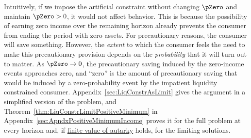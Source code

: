 \documentclass[\econtexRoot/BufferStockTheory]{subfiles}
\begin{document}
Intuitively, if we impose the artificial constraint without changing $\pZero$ and maintain $\pZero>0$, it would not affect behavior.
This is because the possibility of earning zero income over the remaining horizon already prevents the consumer from ending the period with zero assets.
For precautionary reasons, the consumer will save something.
However, the \textit{extent} to which the consumer feels the need to make this precautionary provision depends on the \textit{probability} that it will turn out to matter.
As  $\pZero \rightarrow 0$, the   precautionary saving induced by the zero-income events approaches zero, and ``zero'' is the amount of precautionary saving that would be induced by a zero-probability event by the impatient liquidity constrained consumer.
Appendix~\ref{sec:LiqConstrAsLimit} gives the argument in a simplified version of the problem, and Theorem~\ref{thm:LiqConstrLimitPositiveMinimum} in Appendix~\ref{sec:ApndxPositiveMinimumIncome} proves it for the full problem at every horizon and, if \hyperlink{FVAC}{finite value of autarky} holds, for the limiting solutions.

\end{document}
